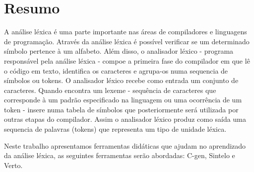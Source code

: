 \section{Resumo} %
\label{sec:resumo}
A análise léxica é uma parte importante nas áreas de compiladores e linguagens de programação. Através da análise léxica é possível verificar se um determinado símbolo pertence à um alfabeto. Além disso, o analisador léxico - programa responsável pela análise léxica - compoe a primeira fase do compilador em que lê o código em texto, identifica os caracteres e agrupa-os numa sequencia de símbolos ou tokens.
O analisador léxico recebe como entrada um conjunto de caracteres. Quando encontra um lexeme - sequência de caracteres que corresponde à um padrão especificado na linguagem ou uma ocorrência de um token - insere numa tabela de símbolos que posteriormente será utilizada por outras etapas do compilador. Assim o analisador léxico produz como saída uma sequencia de palavras (tokens) que representa um tipo de unidade léxica.\cite{aho2007compilers}\cite{Sebesta201201}

Neste trabalho apresentamos ferramentas didáticas que ajudam no aprendizado da análise léxica, as seguintes ferramentas serão abordadas: C-gen, Sintelo e Verto.

